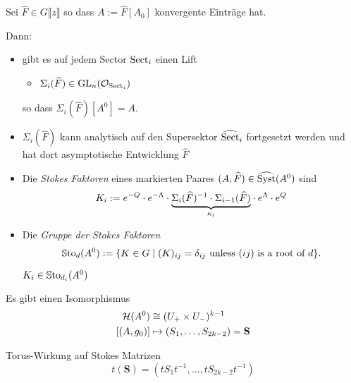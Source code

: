 \begin{thm}[3.1]
  Sei $\hat{F}\in G\llbracket z\rrbracket$ so dass $A:=\hat F[A_0]$ konvergente
  Einträge hat.

  Dann:
  \begin{itemize}
    \item
      gibt es auf jedem Sector $\operatorname{Sect}_i$ einen Lift
      \begin{itemize}
        \item $\Sigma_i(\widehat F)\in\operatorname{GL}_n(\mathcal{O}_{\operatorname{Sect}_i})$
      \end{itemize}
      so dass $\Sigma_i(\hat F)[A^0]=A$.
    \item $\Sigma_i(\hat F)$ kann analytisch auf den Supersektor
      $\widehat{\operatorname{Sect}}_i$ fortgesetzt werden und hat dort asymptotische
      Entwicklung $\hat F$
  \end{itemize}
  \begin{comment}
    \begin{itemize}
      \item If $g\in G\{z\}$ and $t\in T$ then
        $\Sigma_i(g\circ\hat F \circ t^{-1})=g\circ\Sigma_i(\hat F)\circ t^{-1}$.
    \end{itemize}
  \end{comment}
\end{thm}
\begin{defn}
  \begin{itemize}
    \item Die \emph{Stokes Faktoren} eines markierten Paares
      $(A,\widehat F)\in\widehat{\operatorname{Syst}}(A^0)$ sind
      \[
        K_i:= e^{-Q}\cdot e^{-\Lambda} \cdot \underset{\kappa_i}{\underbrace{%
          \Sigma_i(\hat F)^{-1}\cdot \Sigma_{i-1}(\hat F)}}
        \cdot  e^{\Lambda}\cdot e^{Q}
      \]
    \item Die \emph{Gruppe der Stokes Faktoren}
      \[
        \operatorname{\mathbb{S}to}_d(A^0) := \{K \in G \mid (K)_{ij}
          =\delta_{ij} \text{ unless } (ij) \text{ is a root of } d\}.
      \]
      \begin{lem}
        $K_i\in\operatorname{\mathbb{S}to}_{d_i}(A^0)$
      \end{lem}
  \end{itemize}
\end{defn}
\begin{lem}[3.2]

\end{lem}
\begin{thm}
  Es gibt einen Isomorphismus
  \begin{align*}
    \mathcal{H}(A^0)&\cong(U_+\times U_-)^{k-1}
  \\ [(A,g_0)]&\mapsto(S_1,\dots,S_{2k-2})=\textbf{S}
  \end{align*}
\end{thm}
Torus-Wirkung auf Stokes Matrizen
\[
  t(\textbf{S})=(tS_1t^{-1},\dots,tS_{2k-2}t^{-1})
\]
